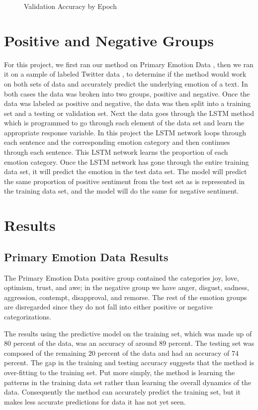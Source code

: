 \documentclass[titlepage,letterpaper]{article}
\begin{document}
\begin{figure}[htb]
	\centering
	\caption{Validation Accuracy by Epoch}
	\resizebox{4in}{!}{}
	\label{valepoch}
\end{figure}

\section{Positive and Negative Groups}

For this project, we first ran our method on Primary Emotion Data \cite{lowriwilliams}, then we ran it on a sample of labeled Twitter data \cite{LabeledTwitter}, to determine if the method would work on both sets of data and accurately predict the underlying emotion of a text. In both cases the data was broken into two groups, positive and negative. Once the data was labeled as positive and negative, the data was then split into a training set and a testing or validation set. Next the data goes through the LSTM method which is programmed to go through each element of the data set and learn the appropriate response variable. In this project the LSTM network loops through each sentence and the corresponding emotion category and then continues through each sentence. This LSTM network learns the proportion of each emotion category. Once the LSTM network has gone through the entire training data set, it will predict the emotion in the test data set. The model will predict the same proportion of positive sentiment from the test set as is represented in the training data set, and the model will do the same for negative sentiment. 

\section{Results}

\subsection{Primary Emotion Data Results}
The Primary Emotion Data positive group contained the categories joy, love, optimism, trust, and awe; in the negative group we have anger, disgust, sadness, aggression, contempt, disapproval, and remorse. The rest of the emotion groups are disregarded since they do not fall into either positive or negative categorizations.

The results using the predictive model on the training set, which was made up of $80$ percent of the data, was an accuracy of around $89$ percent. The testing set was composed of the remaining $20$ percent of the data and had an accuracy of $74$ percent. The gap in the training and testing accuracy suggests that the method is over-fitting to  the training set. Put more simply, the method is learning the patterns in the training data set rather than learning the overall dynamics of the data. Consequently the method can accurately predict the training set, but it makes less accurate predictions for data it has not yet seen.
\end{document}
